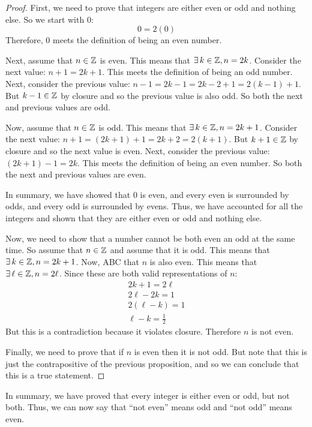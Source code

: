 \documentclass[letterpaper,12pt,fleqn]{article}
\begin{document}
\begin{proof}
  First, we need to prove that integers are either even or odd and nothing else.  So we start with \(0\):
  \[0=2(0)\]
  Therefore, \(0\) meets the definition of being an even number.

  Next, assume that \(n\in\mathbb{Z}\) is even.  This means that \(\exists\,k\in\mathbb{Z},n=2k\).  Consider the next value:
  \(n+1=2k+1\).  This meets the definition of being an odd number.  Next, consider the previous value:
  \(n-1=2k-1=2k-2+1=2(k-1)+1\).  But \(k-1\in\mathbb{Z}\) by closure and so the previous value is also odd.  So both the
  next and previous values are odd.

  Now, assume that \(n\in\mathbb{Z}\) is odd.  This means that \(\exists\,k\in\mathbb{Z},n=2k+1\).  Consider the next value:
  \(n+1=(2k+1)+1=2k+2=2(k+1)\).  But \(k+1\in\mathbb{Z}\) by closure and so the next value is even.  Next, consider the
  previous value: \((2k+1)-1=2k\).  This meets the definition of being an even number.  So both the next and
  previous values are even.

  In summary, we have showed that \(0\) is even, and every even is surrounded by odds, and every odd is surrounded
  by evens.  Thus, we have accounted for all the integers and shown that they are either even or odd and nothing
  else.

  Now, we need to show that a number cannot be both even an odd at the same time.  So assume that \(n\in\mathbb{Z}\) and
  assume that it is odd.  This means that \(\exists\,k\in\mathbb{Z},n=2k+1\).  Now, ABC that \(n\) is also even.  This means
  that \(\exists\,\ell\in\mathbb{Z},n=2\ell\).  Since these are both valid representations of \(n\):
  \begin{gather*}
    2k+1=2\ell \\
    2\ell-2k=1 \\
    2(\ell-k)=1 \\
    \ell-k=\frac{1}{2}
  \end{gather*}
  But this is a contradiction because it violates closure.  Therefore \(n\) is not even.

  Finally, we need to prove that if \(n\) is even then it is not odd.  But note that this is just the
  contrapositive of the previous proposition, and so we can conclude that this is a true statement.
\end{proof}

In summary, we have proved that every integer is either even or odd, but not both.  Thus, we can now say that
``not even'' means odd and ``not odd'' means even.
\end{document}
